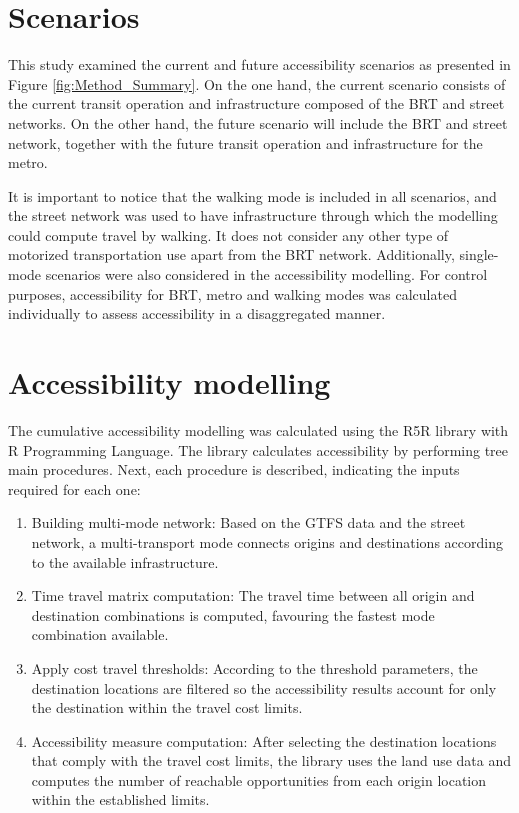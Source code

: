 \documentclass[12pt, a4paper]{report}
\begin{document}
\section{Scenarios} \label{Scenarios}

This study examined the current and future accessibility scenarios as presented in Figure \ref{fig:Method_Summary}. On the one hand, the current scenario consists of the current transit operation and infrastructure composed of the BRT and street networks. On the other hand, the future scenario will include the BRT and street network, together with the future transit operation and infrastructure for the metro.

It is important to notice that the walking mode is included in all scenarios, and the street network was used to have infrastructure through which the modelling could compute travel by walking. It does not consider any other type of motorized transportation use apart from the BRT network. Additionally, single-mode scenarios were also considered in the accessibility modelling. For control purposes, accessibility for BRT, metro and walking modes was calculated individually to assess accessibility in a disaggregated manner.

\section{Accessibility modelling}

The cumulative accessibility modelling was calculated using the R5R library \citep{pereiraR5rRapidRealistic2021} with R Programming Language. The library calculates accessibility by performing tree main procedures. Next, each procedure is described, indicating the inputs required for each one:

\begin{enumerate}
    \item Building multi-mode network: Based on the GTFS data and the street network, a multi-transport mode connects origins and destinations according to the available infrastructure.
    \item Time travel matrix computation: The travel time between all origin and destination combinations is computed, favouring the fastest mode combination available.
    \item Apply cost travel thresholds: According to the threshold parameters, the destination locations are filtered so the accessibility results account for only the destination within the travel cost limits.
    \item Accessibility measure computation: After selecting the destination locations that comply with the travel cost limits, the library uses the land use data and computes the number of reachable opportunities from each origin location within the established limits. 
\end{enumerate}
\end{document}
